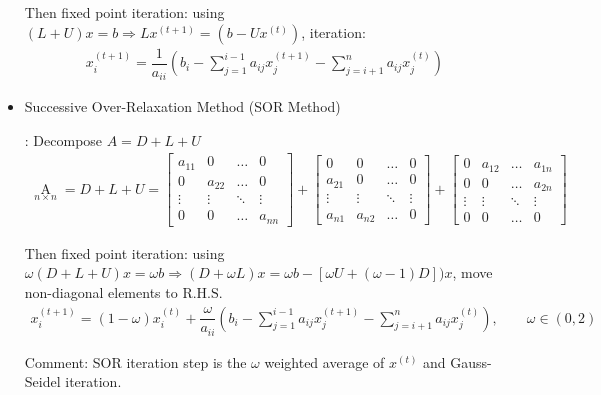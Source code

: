 \begin{itemize}[topsep=2pt,itemsep=0pt]
    Then fixed point iteration: using $ (L+U)x=b \Rightarrow Lx^{(t+1)}=(b-Ux^{(t)})$, iteration:
    \begin{align}
        x_i^{(t+1)}=\dfrac{1}{a_{ii}}\left(b_i-\sum_{j=1}^{i-1}a_{ij}x_j^{(t+1)}-\sum_{j=i+1}^na_{ij}x_j^{(t)}\right)
    \end{align}


    \item \hypertarget{SORMethod}{Successive Over-Relaxation Method (SOR Method)}: Decompose $ A=D+L+U $
    \begin{align}
        \mathop{A}\limits_{n\times n} =D+L+U=
        \begin{bmatrix}
        a_{11}&0&\ldots &0\\
        0&a_{22}&\ldots &0\\
        \vdots&\vdots&\ddots&\vdots\\
        0&0&\ldots&a_{nn}
        \end{bmatrix}+
        \begin{bmatrix}
        0&0&\ldots&0\\
        a_{21}&0&\ldots&0\\
        \vdots&\vdots&\ddots&\vdots\\
        a_{n1}&a_{n2}&\ldots&0
        \end{bmatrix}
        +\begin{bmatrix}
        0&a_{12}&\ldots&a_{1n}\\
        0&0&\ldots&a_{2n}\\
        \vdots&\vdots&\ddots&\vdots\\
        0&0&\ldots&0
        \end{bmatrix}
    \end{align}
        
    Then fixed point iteration: using $ \omega (D+L+U)x=\omega b \Rightarrow (D+\omega L)x=\omega b-\left[\omega U+(\omega -1)D\right])x$, move non-diagonal elements to $  \mathrm{R.H.S.} $ 
    \begin{align}
        x_i^{(t+1)}=(1-\omega )x_i^{(t)}+\dfrac{\omega }{a_{ii}}\left(b_i-\sum_{j=1}^{i-1}a_{ij}x_j^{(t+1)}-\sum_{j=i+1}^na_{ij}x_j^{(t)}\right),\qquad \omega \in(0,2)
    \end{align}

        Comment: SOR iteration step is the $ \omega  $ weighted average of $ x^{(t)} $ and Gauss-Seidel iteration.


\end{itemize}



